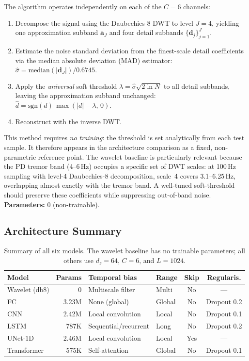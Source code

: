 \documentclass{article}
\begin{document}
The algorithm operates independently on each of the $C = 6$ channels:
\begin{enumerate}[leftmargin=*,itemsep=0pt]
  \item Decompose the signal using the Daubechies-8 DWT to level $J = 4$,
        yielding one approximation subband $\mathbf{a}_J$ and four detail
        subbands $\{\mathbf{d}_j\}_{j=1}^{J}$.
  \item Estimate the noise standard deviation from the finest-scale detail
        coefficients via the median absolute deviation (MAD) estimator:
        $\hat{\sigma} = \text{median}(|\mathbf{d}_J|) / 0.6745$.
  \item Apply the \emph{universal} soft threshold
        $\lambda = \hat{\sigma}\sqrt{2\ln N}$ to all detail subbands,
        leaving the approximation subband unchanged:
        $\hat{d} = \text{sgn}(d)\,\max(|d| - \lambda,\, 0)$.
  \item Reconstruct with the inverse DWT.
\end{enumerate}

This method requires \emph{no training}: the threshold is set analytically
from each test sample.
It therefore appears in the architecture comparison as a fixed, non-parametric
reference point.
The wavelet baseline is particularly relevant because the PD tremor band
(4--6\,Hz) occupies a specific set of DWT scales: at 100\,Hz sampling with
level-4 Daubechies-8 decomposition, scale~4 covers 3.1--6.25\,Hz, overlapping
almost exactly with the tremor band.
A well-tuned soft-threshold should preserve these coefficients while
suppressing out-of-band noise.
\textbf{Parameters:} 0 (non-trainable).

\subsection{Architecture Summary}

\begin{table}[ht]
\caption{Summary of all six models. The wavelet baseline has no trainable
parameters; all others use $d_z = 64$, $C = 6$, and $L = 1024$.}
\label{tab:arch-summary}
\begin{center}
\begin{tabular}{lrllcc}
\toprule
\textbf{Model} & \textbf{Params} & \textbf{Temporal bias} & \textbf{Range} & \textbf{Skip} & \textbf{Regularis.} \\
\midrule
Wavelet (db8) & 0     & Multiscale filter   & Multi   & No  & ---         \\
FC          & 3.23M & None (global)       & Global  & No  & Dropout 0.2 \\
CNN         & 2.42M & Local convolution   & Local   & No  & Dropout 0.1 \\
LSTM        & 787K  & Sequential/recurrent& Long    & No  & Dropout 0.2 \\
UNet-1D     & 2.46M & Local convolution   & Local   & Yes & ---         \\
Transformer & 575K  & Self-attention      & Global  & No  & Dropout 0.1 \\
\bottomrule
\end{tabular}
\end{center}
\end{table}
\end{document}
